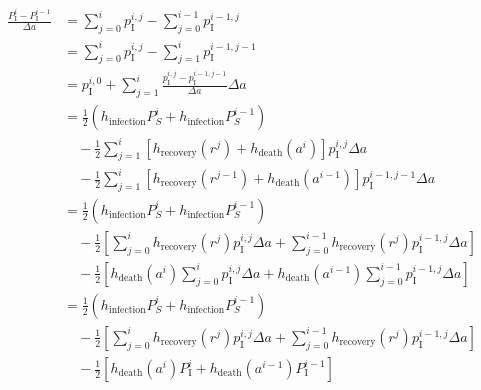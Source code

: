 \documentclass[12pt]{article}
\begin{document}
\begin{equation}
  \label{eq:sum_difference}
  \begin{split}
    \frac{P_{\mathrm{I}}^i - P_{\mathrm{I}}^{i - 1}}{\Delta a}
    &=
    \sum_{j = 0}^i p_{\mathrm{I}}^{i, j}
    - \sum_{j = 0}^{i - 1} p_{\mathrm{I}}^{i - 1, j}
    \\
    &=
    \sum_{j = 0}^i p_{\mathrm{I}}^{i, j}
    - \sum_{j = 1}^i p_{\mathrm{I}}^{i - 1, j - 1}
    \\
    &= p_{\mathrm{I}}^{i, 0}
    + \sum_{j = 1}^i
    \frac{p_{\mathrm{I}}^{i, j} - p_{\mathrm{I}}^{i - 1, j - 1}}
    {\Delta a} \Delta a
    \\
    &= \frac{1}{2} \left(h_{\text{infection}} P_S^i
      + h_{\text{infection}} P_S^{i - 1}\right)
    \\ & \quad {}
    - \frac{1}{2} \sum_{j = 1}^i
    \left[h_{\text{recovery}}(r^j) + h_{\text{death}}(a^i)\right]
    p_{\mathrm{I}}^{i, j} \Delta a
    \\ & \quad {}
    - \frac{1}{2} \sum_{j = 1}^i
    \left[h_{\text{recovery}}(r^{j - 1}) + h_{\text{death}}(a^{i - 1})\right]
    p_{\mathrm{I}}^{i - 1, j - 1} \Delta a
    \\
    &= \frac{1}{2} \left(h_{\text{infection}} P_S^i
      + h_{\text{infection}} P_S^{i - 1}\right)
    \\ & \quad {}
    - \frac{1}{2} \left[
      \sum_{j = 0}^i h_{\text{recovery}}(r^j)
      p_{\mathrm{I}}^{i, j} \Delta a
      + \sum_{j = 0}^{i - 1} h_{\text{recovery}}(r^j)
      p_{\mathrm{I}}^{i - 1, j} \Delta a
    \right]
    \\ & \quad {}
    - \frac{1}{2} \left[
      h_{\text{death}}(a^i)
      \sum_{j = 0}^i p_{\mathrm{I}}^{i, j} \Delta a
      + h_{\text{death}}(a^{i - 1})
      \sum_{j = 0}^{i - 1} p_{\mathrm{I}}^{i - 1, j} \Delta a
    \right]
    \\
    &= \frac{1}{2} \left(h_{\text{infection}} P_S^i
      + h_{\text{infection}} P_S^{i - 1}\right)
    \\ & \quad {}
    - \frac{1}{2} \left[
      \sum_{j = 0}^i h_{\text{recovery}}(r^j)
      p_{\mathrm{I}}^{i, j} \Delta a
      + \sum_{j = 0}^{i - 1} h_{\text{recovery}}(r^j)
      p_{\mathrm{I}}^{i - 1, j} \Delta a
    \right]
    \\ & \quad {}
    - \frac{1}{2} \left[
      h_{\text{death}}(a^i) P_{\mathrm{I}}^i
      + h_{\text{death}}(a^{i - 1}) P_{\mathrm{I}}^{i - 1}
    \right]
  \end{split}
\end{equation}
\end{document}
